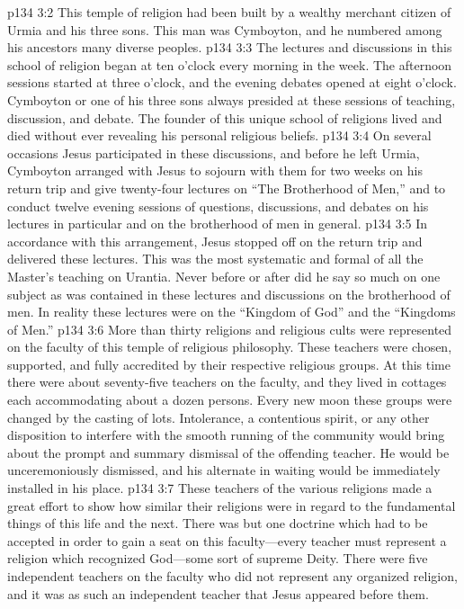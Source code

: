 \vs p134 3:2 This temple of religion had been built by a wealthy merchant citizen of Urmia and his three sons. This man was Cymboyton, and he numbered among his ancestors many diverse peoples.
\vs p134 3:3 The lectures and discussions in this school of religion began at ten o’clock every morning in the week. The afternoon sessions started at three o’clock, and the evening debates opened at eight o’clock. Cymboyton or one of his three sons always presided at these sessions of teaching, discussion, and debate. The founder of this unique school of religions lived and died without ever revealing his personal religious beliefs.
\vs p134 3:4 On several occasions Jesus participated in these discussions, and before he left Urmia, Cymboyton arranged with Jesus to sojourn with them for two weeks on his return trip and give twenty\hyp{}four lectures on “The Brotherhood of Men,” and to conduct twelve evening sessions of questions, discussions, and debates on his lectures in particular and on the brotherhood of men in general.
\vs p134 3:5 In accordance with this arrangement, Jesus stopped off on the return trip and delivered these lectures. This was the most systematic and formal of all the Master’s teaching on Urantia. Never before or after did he say so much on one subject as was contained in these lectures and discussions on the brotherhood of men. In reality these lectures were on the “Kingdom of God” and the “Kingdoms of Men.”
\vs p134 3:6 More than thirty religions and religious cults were represented on the faculty of this temple of religious philosophy. These teachers were chosen, supported, and fully accredited by their respective religious groups. At this time there were about seventy\hyp{}five teachers on the faculty, and they lived in cottages each accommodating about a dozen persons. Every new moon these groups were changed by the casting of lots. Intolerance, a contentious spirit, or any other disposition to interfere with the smooth running of the community would bring about the prompt and summary dismissal of the offending teacher. He would be unceremoniously dismissed, and his alternate in waiting would be immediately installed in his place.
\vs p134 3:7 These teachers of the various religions made a great effort to show how similar their religions were in regard to the fundamental things of this life and the next. There was but one doctrine which had to be accepted in order to gain a seat on this faculty---every teacher must represent a religion which recognized God---some sort of supreme Deity. There were five independent teachers on the faculty who did not represent any organized religion, and it was as such an independent teacher that Jesus appeared before them.
